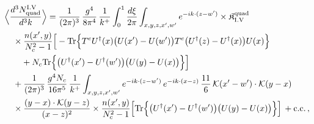 \begin{align}\label{eq:S-I.V-2o}
&\Big\langle\frac{d^{3}N^{\rm I.V}_{{\rm quad}}}{d^{3}k}\Big\rangle=\frac{1}{(2\pi)^{3}}\, \frac{g^{4}}{8\pi^{4}}\, \frac{1}{k^{+}} \int_{0}^{1}\frac{d\xi}{2\pi} \int_{x,y,z,x',w'}e^{-ik\cdot(z-w')} \times \mathfrak{K}^{\rm quad}_{\rm I.V}\notag\\
&\quad \times\frac{n(x',y)}{N_{c}^{2}-1}\Big[-{\rm Tr}\Big\{T^{e}U^{\dagger}(x)\big(U(x')-U(w')\big)T^{e}\big(U^{\dagger}(z)-U^{\dagger}(x)\big)U(x)\Big\}\notag\\
&\quad\quad +N_{c}{\rm Tr}\Big\{\big(U^{\dagger}(x')-U^{\dagger}(w')\big)\big(U(y)-U(x)\big)\Big\}\Big]\notag\\
&\quad +\frac{1}{(2\pi)^{3}}\, \frac{g^{4}N_{c}}{16\pi^{5}}\, \frac{1}{k^{+}} \int_{x,y,z,x',w'}e^{-ik\cdot(z-w')}\, e^{-ik\cdot(x-z)}\, \frac{11}{6}\, \mathcal{K}(x'-w')\cdot\mathcal{K}(y-x)\notag\\
&\quad \times \frac{(y-x)\cdot\mathcal{K}(y-z)}{(x-z)^{2}} \times\frac{n(x',y)}{N_{c}^{2}-1}\Big[{\rm Tr}\Big\{\big(U^{\dagger}(x')-U^{\dagger}(w')\big)\big(U(y)-U(x)\big)\Big\}\Big]\, +{\rm c.c.}\, ,
\end{align}
